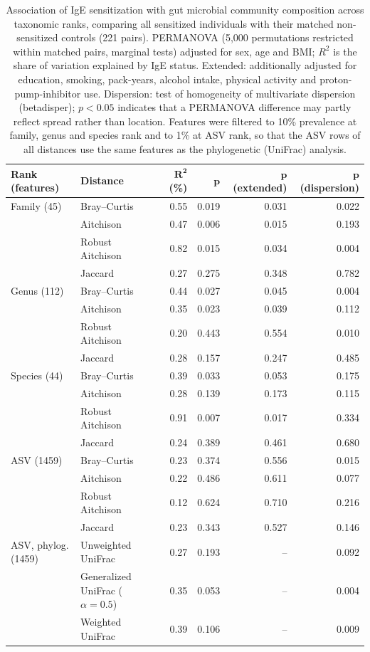 \begin{table}[h!]
\centering
\small
\setlength{\tabcolsep}{4pt}
\begin{tabular}{l l r r r r}
\textbf{Rank (features)} & \textbf{Distance} & $\boldsymbol{R^2}$ \textbf{(\%)} & $\boldsymbol{p}$ & $\boldsymbol{p}$ \textbf{(extended)} & $\boldsymbol{p}$ \textbf{(dispersion)} \\
\hline
Family (45) & Bray--Curtis & 0.55 & 0.019 & 0.031 & 0.022 \\
 & Aitchison & 0.47 & 0.006 & 0.015 & 0.193 \\
 & Robust Aitchison & 0.82 & 0.015 & 0.034 & 0.004 \\
 & Jaccard & 0.27 & 0.275 & 0.348 & 0.782 \\
\hline
Genus (112) & Bray--Curtis & 0.44 & 0.027 & 0.045 & 0.004 \\
 & Aitchison & 0.35 & 0.023 & 0.039 & 0.112 \\
 & Robust Aitchison & 0.20 & 0.443 & 0.554 & 0.010 \\
 & Jaccard & 0.28 & 0.157 & 0.247 & 0.485 \\
\hline
Species (44) & Bray--Curtis & 0.39 & 0.033 & 0.053 & 0.175 \\
 & Aitchison & 0.28 & 0.139 & 0.173 & 0.115 \\
 & Robust Aitchison & 0.91 & 0.007 & 0.017 & 0.334 \\
 & Jaccard & 0.24 & 0.389 & 0.461 & 0.680 \\
\hline
ASV (1459) & Bray--Curtis & 0.23 & 0.374 & 0.556 & 0.015 \\
 & Aitchison & 0.22 & 0.486 & 0.611 & 0.077 \\
 & Robust Aitchison & 0.12 & 0.624 & 0.710 & 0.216 \\
 & Jaccard & 0.23 & 0.343 & 0.527 & 0.146 \\
\hline
ASV, phylog. (1459) & Unweighted UniFrac & 0.27 & 0.193 & -- & 0.092 \\
 & Generalized UniFrac ($\alpha = 0.5$) & 0.35 & 0.053 & -- & 0.004 \\
 & Weighted UniFrac & 0.39 & 0.106 & -- & 0.009 \\
\hline
\end{tabular}
\caption{Association of IgE sensitization with gut microbial community composition across taxonomic ranks, comparing all sensitized individuals with their matched non-sensitized controls (221 pairs). PERMANOVA (5,000 permutations restricted within matched pairs, marginal tests) adjusted for sex, age and BMI; $R^2$ is the share of variation explained by IgE status. Extended: additionally adjusted for education, smoking, pack-years, alcohol intake, physical activity and proton-pump-inhibitor use. Dispersion: test of homogeneity of multivariate dispersion (betadisper); $p < 0.05$ indicates that a PERMANOVA difference may partly reflect spread rather than location. Features were filtered to 10\% prevalence at family, genus and species rank and to 1\% at ASV rank, so that the ASV rows of all distances use the same features as the phylogenetic (UniFrac) analysis.\label{tab:beta_ranks}}
\end{table}
